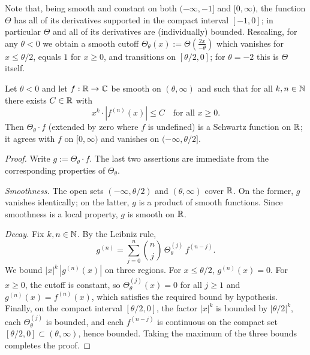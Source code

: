 Note that, being smooth and constant on both $(-\infty, -1]$ and $[0, \infty)$, the function $\Theta$ has all of its derivatives supported in the compact interval $[-1, 0]$; in particular $\Theta$ and all of its derivatives are (individually) bounded. Rescaling, for any $\theta < 0$ we obtain a smooth cutoff $\Theta_\theta(x) := \Theta\left(\frac{2x}{-\theta}\right)$ which vanishes for $x \leq \theta/2$, equals $1$ for $x \geq 0$, and transitions on $[\theta/2, 0]$; for $\theta = -2$ this is $\Theta$ itself.

\begin{theorem}\label{thm:cutoff-schwartz}\leanok
  Let $\theta < 0$ and let $f : \mathbb{R} \to \mathbb{C}$ be smooth on $(\theta, \infty)$ and such that for all $k, n \in \mathbb{N}$ there exists $C \in \mathbb{R}$ with
  \[
    x^{k} \cdot |f^{(n)}(x)| \leq C \quad \text{for all } x \geq 0.
  \]
  Then $\Theta_\theta \cdot f$ (extended by zero where $f$ is undefined) is a Schwartz function on $\mathbb{R}$; it agrees with $f$ on $[0, \infty)$ and vanishes on $(-\infty, \theta/2]$.
\end{theorem}
\begin{proof}
  Write $g := \Theta_\theta \cdot f$. The last two assertions are immediate from the corresponding properties of $\Theta_\theta$.

  \emph{Smoothness.} The open sets $(-\infty, \theta/2)$ and $(\theta, \infty)$ cover $\mathbb{R}$. On the former, $g$ vanishes identically; on the latter, $g$ is a product of smooth functions. Since smoothness is a local property, $g$ is smooth on $\mathbb{R}$.

  \emph{Decay.} Fix $k, n \in \mathbb{N}$. By the Leibniz rule,
  \[
    g^{(n)} = \sum_{j=0}^{n} \binom{n}{j}\, \Theta_\theta^{(j)}\, f^{(n-j)}.
  \]
  We bound $|x|^k\,|g^{(n)}(x)|$ on three regions. For $x \leq \theta/2$, $g^{(n)}(x) = 0$. For $x \geq 0$, the cutoff is constant, so $\Theta_\theta^{(j)}(x) = 0$ for all $j \geq 1$ and $g^{(n)}(x) = f^{(n)}(x)$, which satisfies the required bound by hypothesis. Finally, on the compact interval $[\theta/2, 0]$, the factor $|x|^k$ is bounded by $|\theta/2|^k$, each $\Theta_\theta^{(j)}$ is bounded, and each $f^{(n-j)}$ is continuous on the compact set $[\theta/2, 0] \subset (\theta, \infty)$, hence bounded. Taking the maximum of the three bounds completes the proof.
\end{proof}

